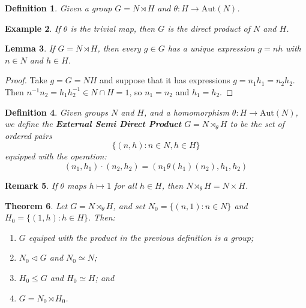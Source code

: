\documentclass[a4paper,10pt]{article}
\newtheorem{thm}{Theorem}
\newtheorem{Def}[thm]{Definition}
\newtheorem{eg}[thm]{Example}
\newtheorem{Lem}[thm]{Lemma}
\newtheorem{rem}[thm]{Remark}
\begin{document}
\begin{Def}
Given a group $G = N \rtimes H$ and $\theta : H \rightarrow \text{Aut}(N)$. 
\end{Def}



\begin{eg}
If $\theta$ is the trivial map, then $G$ is the direct product of $N$ and $H$. 
\end{eg}

\begin{Lem}
If $G = N \rtimes H$, then every $g \in G$ has a unique expression $g = nh$ with $n \in N$ and $h \in H$.
\end{Lem}

\begin{proof}
Take $g = G = NH$ and suppose that it has expressions $g = n_1 h_1 = n_2 h_2$. Then $n^{-1} n_2 = h_1 h_2^{-1} \in N \cap H = 1$, so $n_1 = n_2$ and $h_1 = h_2$. 
\end{proof}


\begin{Def}
Given groups $N$ and $H$, and a homomorphism $\theta: H \rightarrow \text{Aut}(N)$, we define the \textbf{External Semi Direct Product} $G = N \rtimes_{\theta} H$ to be the set of ordered pairs
\[ \{ (n,h) : n \in N, h \in H \} \]
equipped with the operation:
\[ (n_1, h_1) \cdot (n_2, h_2) = ( n_1 \theta(h_1) (n_2), h_1, h_2 ) \]
\end{Def}

\begin{rem}
If $\theta$ maps $h \mapsto 1$ for all $h \in H$, then $N \rtimes_{\theta} H = N \times H$. 
\end{rem}

\begin{thm}
Let $G = N \rtimes_\theta H$, and set $N_0 = \{ (n,1) : n \in N \}$ and $H_0 = \{ (1, h) : h \in H \}$. Then:
\begin{enumerate}
\item $G$ equiped with the product in the previous definition is a group;
\item $N_0 \triangleleft G$ and $N_0 \simeq N$; 
\item $H_0 \leq G$ and $H_0 \simeq H$; and
\item $G = N_0 \rtimes H_0$. 
\end{enumerate}

\end{thm}
\end{document}
